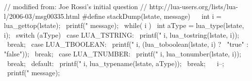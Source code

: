 \startCHeader
// modified from: Joe Rossi's initial question
// http://lua-users.org/lists/lua-l/2006-03/msg00335.html
#define stackDump(lstate, message)                \
  {                                               \
    int i = lua_gettop(lstate);                   \
    printf("%
      message);                                   \
    while( i ) {                                  \
      int aType = lua_type(lstate, i);            \
      switch (aType) {                            \
      case LUA_TSTRING:                           \
        printf("%
          i, lua_tostring(lstate, i));            \
        break;                                    \
      case LUA_TBOOLEAN:                          \
        printf("%
          i, (lua_toboolean(lstate, i) ?          \
            "true" : "false"));                   \
        break;                                    \
      case LUA_TNUMBER:                           \
        printf("%
          i, lua_tonumber(lstate, i));            \
        break;                                    \
      default:                                    \
        printf("%
          i, lua_typename(lstate, aType));        \
        break;                                    \
      }                                           \
      i--;                                        \
    }                                             \
    printf("%
      message);                                   \
  }
\stopCHeader


